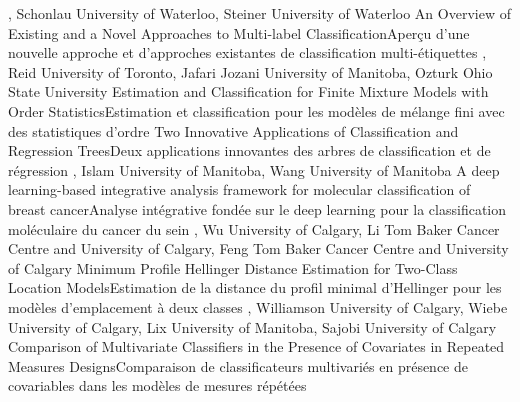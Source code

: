 {
,  {Schonlau}
{University of Waterloo},  {Steiner}
{University of Waterloo}
}
{An Overview of Existing and a Novel Approaches to Multi-label Classification}{Aperçu d’une nouvelle approche et d’approches existantes de classification multi-étiquettes}
{\bubbleE \enspace \screenE}
{
,  {Reid}
{University of Toronto},  {Jafari Jozani}
{University of Manitoba},  {Ozturk}
{Ohio State University}
}
{Estimation and Classification for Finite Mixture Models with Order Statistics}{Estimation et classification pour les modèles de mélange fini avec des statistiques d’ordre}
{\bubbleE \enspace \screenE}
{
}
{Two Innovative Applications of Classification and Regression Trees}{Deux applications innovantes des arbres de classification et de régression}
{\bubbleE \enspace \screenE}
{
,  {Islam}
{University of Manitoba},  {Wang}
{University of Manitoba}
}
{A deep learning-based integrative analysis framework for molecular classification of breast cancer}{Analyse intégrative fondée sur le deep learning pour la classification moléculaire du cancer du sein}
{\bubbleE \enspace \screenE}
{
,  {Wu}
{University of Calgary},  {Li}
{Tom Baker Cancer Centre and University of Calgary},  {Feng}
{Tom Baker Cancer Centre and University of Calgary}
}
{Minimum Profile Hellinger Distance Estimation for Two-Class Location Models}{Estimation de la distance du profil minimal d’Hellinger pour les modèles d’emplacement à deux classes}
{\bubbleE \enspace \screenE}
{
,  {Williamson}
{University of Calgary},  {Wiebe}
{University of Calgary},  {Lix}
{University of Manitoba},  {Sajobi}
{University of Calgary}
}
{Comparison of Multivariate Classifiers in the Presence of Covariates in Repeated Measures Designs}{Comparaison de classificateurs multivariés en présence de covariables dans les modèles de mesures répétées}
{\bubbleE \enspace \screenE}


